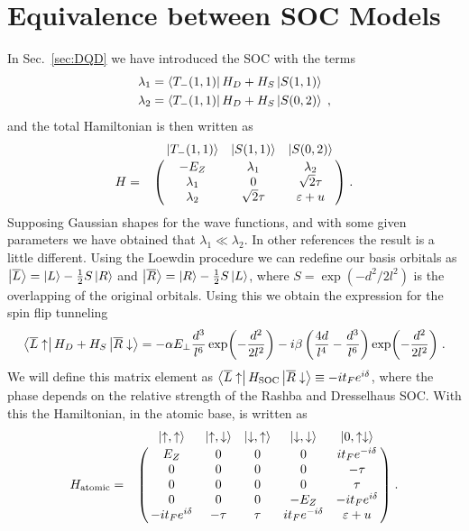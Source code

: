 \documentclass[a4paper,11pt]{article}
\begin{document}
\section{Equivalence between SOC Models}
In Sec.~\ref{sec:DQD} we have introduced the SOC with the terms
\begin{equation}
	\begin{split}
	\lambda_1&=\bra{T_-(1,1)}H_D+H_S\ket{S(1,1)}\\
	\lambda_2&=\bra{T_-(1,1)}H_D+H_S\ket{S(0,2)}\; ,
	\end{split}
\end{equation}
and the total Hamiltonian is then written as
\begin{equation}
H=\bordermatrix{~ & \ket{T_-(1,1)} & \ket{S(1,1)} & \ket{S(0,2)}\cr
	~ & -E_Z & \lambda_1 & \lambda_2 \cr
	~ & \lambda_1 & 0 & \sqrt{2}\tau \cr
	~ & \lambda_2 & \sqrt{2}\tau & \varepsilon+u \cr}\; .
\label{eq:Hamiltonian_Yue}
\end{equation}
Supposing Gaussian shapes for the wave functions, and with some given parameters we have obtained that $\lambda_1\ll\lambda_2$. In other references \cite{Bogan2018} the result is a little different. Using the Loewdin procedure we can redefine our basis orbitals as $\ket{\overline{L}}=\ket{L}-\frac{1}{2}S\ket{R}$ and $\ket{\overline{R}}=\ket{R}-\frac{1}{2}S\ket{L}$, where $S=\exp(-d^2/2l^2)$ is the overlapping of the original orbitals. Using this we obtain the expression for the spin flip tunneling
\begin{equation}
	\bra{\overline{L}\uparrow}H_D+H_S\ket{\overline{R}\downarrow}=-\alpha E_\perp \frac{d^3}{l^6}\exp(-\frac{d^2}{2l^2})-i\beta\left(\frac{4d}{l^4}-\frac{d^3}{l^6}\right)\exp(-\frac{d^2}{2l^2})\; .
\end{equation}
We will define this matrix element as $\bra{\overline{L}\uparrow}H_{\text{SOC}}\ket{\overline{R}\downarrow}\equiv -it_Fe^{i\delta}$, where the phase depends on the relative strength of the Rashba and Dresselhaus SOC. With this the Hamiltonian, in the atomic base, is written as
\begin{equation}
H_{\text{atomic}}=\bordermatrix{~ & \ket{\uparrow,\uparrow} & \ket{\uparrow,\downarrow} & \ket{\downarrow,\uparrow} & \ket{\downarrow,\downarrow} & \ket{0,\uparrow\downarrow}\cr
	~ & E_Z   			 & 0     & 0    & 0    			   & it_Fe^{-i\delta}  \cr
	~ & 0     			 & 0     & 0    & 0    			   & -\tau  		  	\cr
	~ & 0     			 & 0     & 0    & 0    			   & \tau 		  		\cr
	~ & 0     			 & 0     & 0    & -E_Z 			   & -it_Fe^{i\delta}   \cr
	~ & -it_Fe^{i\delta} & -\tau & \tau & it_Fe^{-i\delta} & \varepsilon+u}\; .
\end{equation}
\end{document}
